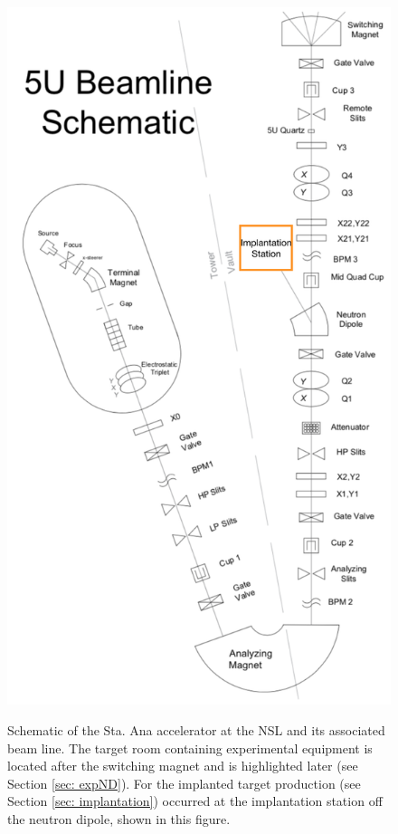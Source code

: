 \begin{figure}
\centering
\includegraphics[width=0.7\linewidth]{figures/staAnaSchematic.png}
\label{fig: staAnaSchematic}
\caption{Schematic of the Sta. Ana accelerator at the NSL and its associated beam line. The target room containing experimental equipment is located after the switching magnet and is highlighted later (see Section \ref{sec: expND}). For the implanted target production (see Section \ref{sec: implantation}) occurred at the implantation station off the neutron dipole, shown in this figure.}
\end{figure}

